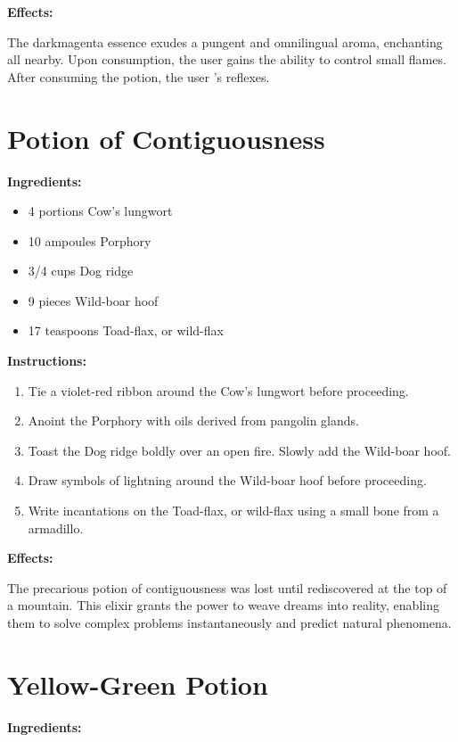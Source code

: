 \documentclass{article}
\begin{document}
\textbf{Effects:}

The darkmagenta essence exudes a pungent and omnilingual aroma, enchanting all nearby. Upon consumption, the user gains the ability to control small flames. After consuming the potion, the user 's reflexes.

\newpage
\section*{Potion of Contiguousness}

\textbf{Ingredients:}

\begin{itemize}
  \item 4 portions Cow's lungwort
  \item 10 ampoules Porphory
  \item 3/4 cups Dog ridge
  \item 9 pieces Wild-boar hoof
  \item 17 teaspoons Toad-flax, or wild-flax
\end{itemize}

\textbf{Instructions:}

\begin{enumerate}
  \item Tie a violet-red ribbon around the Cow's lungwort before proceeding.
  \item Anoint the Porphory with oils derived from pangolin glands.
  \item Toast the Dog ridge boldly over an open fire. Slowly add the Wild-boar hoof.
  \item Draw symbols of lightning around the Wild-boar hoof before proceeding.
  \item Write incantations on the Toad-flax, or wild-flax using a small bone from a armadillo.
\end{enumerate}

\textbf{Effects:}

The precarious potion of contiguousness was lost until rediscovered at the top of a mountain. This elixir grants the power to weave dreams into reality, enabling them to solve complex problems instantaneously and predict natural phenomena.

\newpage
\section*{Yellow-Green Potion}

\textbf{Ingredients:}
\end{document}
